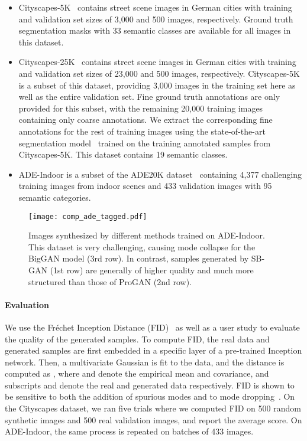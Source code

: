 \documentclass[10pt,twocolumn,letterpaper]{article}
\begin{document}
{\begin{itemize}[itemsep=0pt,topsep=1pt]
    \item Cityscapes-5K~\cite{cityscapes} contains street scene images in German cities with training and validation set sizes of 3,000 and 500 images, respectively. Ground truth segmentation masks with 33 semantic classes are available for all images in this dataset.
    \item Cityscapes-25K~\cite{cityscapes} contains street scene images in German cities with training and validation set sizes of 23,000 and 500 images, respectively. Cityscapes-5K is a subset of this dataset, providing 3,000 images in the training set here as well as the entire validation set. Fine ground truth annotations are only provided for this subset, with the remaining 20,000 training images containing only coarse annotations.
    We extract the corresponding fine annotations for the rest of training images using the state-of-the-art segmentation model~\cite{DRN, Yu2016} trained on the training annotated samples from Cityscapes-5K. This dataset contains 19 semantic classes. 
    \item ADE-Indoor is a subset of the ADE20K dataset~\cite{ADE20k} containing 4,377 challenging training images from indoor scenes and 433 validation images with 95 semantic categories. 
\end{itemize}

\begin{figure*}
\centering
\texttt{[image: comp\_ade\_tagged.pdf]}
\caption{Images synthesized by different methods trained on ADE-Indoor. This dataset is very challenging, causing mode collapse for the BigGAN model (3rd row). In contrast, samples generated by SB-GAN (1st row) are generally of higher quality and much more structured than those of ProGAN (2nd row).}
\label{fig:ade}
\end{figure*}

\vspace{-3mm}
\paragraph{Evaluation} We use the Fr{\'e}chet Inception Distance (FID)~\cite{heusel2017gans} as well as a user study to evaluate the quality of the generated samples. To compute FID, the real data and generated samples are first embedded in a specific layer of a pre-trained Inception network. Then, a multivariate Gaussian is fit to the data, and the distance is computed as
,
where  and  denote the empirical mean and covariance, and subscripts  and  denote the real and generated data respectively. FID is shown to be sensitive to both the addition of spurious modes and to mode dropping~\cite{sajjadi2018assessing,lucic2018}. On the Cityscapes dataset, we ran five trials where we computed FID on 500 random synthetic images and 500 real validation images, and report the average score. On ADE-Indoor, the same process is repeated on batches of 433 images.  

}
\end{document}
